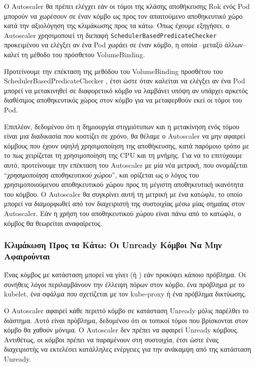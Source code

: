 Ο Autoscaler θα πρέπει ελέγχει εάν οι τόμοι της κλάσης αποθήκευσης Rok ενός Pod μπορούν
να χωρέσουν σε έναν κόμβο ως προς τον απαιτούμενο αποθηκευτικό χώρο  κατά την
αξιολόγηση της κλιμάκωσης προς τα κάτω. Όπως έχουμε εξηγήσει, ο Autoscaler χρησιμοποιεί
τη διεπαφή \texttt{SchedulerBasedPredicateChecker} προκειμένου να ελέγξει αν ένα
Pod χωράει σε έναν κόμβο, η οποία --μεταξύ άλλων-- καλεί τη μέθοδο
 του πρόσθετου VolumeBinding.

Προτείνουμε την επέκταση της μεθόδου  του VolumeBinding προσθέτου του
SchedulerBasedPredicateChecker , έτσι ώστε όταν καλείται να ελέγξει αν ένα Pod
μπορεί να μετακινηθεί σε διαφορετικό κόμβο να λαμβάνει υπόψη αν υπάρχει αρκετός
διαθέσιμος αποθηκευτικός χώρος στον κόμβο για να μεταφερθούν εκεί οι τόμοι του
Pod.

Επιπλέον, δεδομένου ότι η δημιουργία στιγμιότυπων και η μετακίνηση ενός τόμου
είναι μια διαδικασία που κοστίζει σε χρόνο, θα θέλαμε ο Autoscaler να μην αφαιρεί
κόμβους που έχουν υψηλή χρησιμοποίηση της αποθήκευσης, κατά παρόμοιο τρόπο με
το πως χειρίζεται τη χρησιμοποίηση της CPU και τη μνήμης. Για να το επιτύχουμε
αυτό, προτείνουμε την επέκταση του Autoscaler με μία νέα μετρική, που ονομάζεται
``\textit{χρησιμοποίηση αποθηκευτικού χώρου}'', και ορίζεται ως ο λόγος του
χρησιμοποιούμενου αποθηκευτικού χώρου προς τη μέγιστη αποθηκευτική ικανότητα του
κόμβου. Ο Autoscaler θα συγκρίνει αυτή τη μετρική με ένα κατώφλι, το οποίο μπορεί να
διαμορφωθεί από τον διαχειριστή της συστοιχίας μέσω μίας σημαίας στον Autoscaler. Εάν η
χρήση του αποθηκευτικού χώρου είναι πάνω από το κατώφλι, ο κόμβος θα θεωρείται
αναφαίρετος.


\subsubsection{Κλιμάκωση Προς τα Κάτω: Οι Unready Κόμβοι Να Μην Αφαιρούνται}

Ένας κόμβος με κατάσταση  μπορεί να γίνει  (ή
) εάν προκύψει κάποιο πρόβλημα. Οι συνήθεις λόγοι περιλαμβάνουν την
έλλειψη πόρων στον κόμβο, ένα πρόβλημα με το kubelet, ένα σφάλμα που σχετίζεται
με τον kube-proxy ή ένα πρόβλημα δικτύωσης.

Ο Autoscaler  αφαιρεί κάθε περιττό κόμβο σε κατάσταση Unready μόλις παρέλθει το
 διάστημα. Αυτό είναι πρόβλημα, δεδομένου ότι
οι τοπικοί τόμοι που βρίσκονται στον κόμβο θα χαθούν μόνιμα. Ο Autoscaler δεν πρέπει να
αφαιρεί Unready κόμβους. Αντιθέτως, οι κόμβοι πρέπει να παραμένουν στη συστοιχία,
έτσι ώστε ένας διαχειριστής να εκτελέσει κατάλληλες ενέργειες για την ανάκαμψη
από της κατάσταση Unready.

